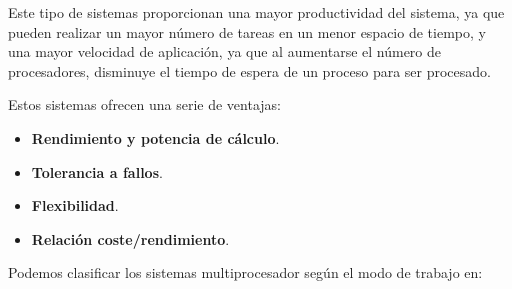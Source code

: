 \documentclass[a4paper, 11pt, titlepage]{article}
\begin{document}
        Este tipo de sistemas proporcionan una mayor productividad del sistema, ya que 
        pueden realizar un mayor número de tareas en un menor espacio de tiempo, y una 
        mayor velocidad de aplicación, ya que al aumentarse el número de procesadores,
        disminuye el tiempo de espera de un proceso para ser procesado.

        Estos sistemas ofrecen una serie de ventajas:

        \begin{itemize}
            \item \textbf{Rendimiento y potencia de cálculo}.
            \item \textbf{Tolerancia a fallos}.
            \item \textbf{Flexibilidad}.
            \item \textbf{Relación coste/rendimiento}.
        \end{itemize}

        Podemos clasificar los sistemas multiprocesador según el modo de trabajo en:
\end{document}
